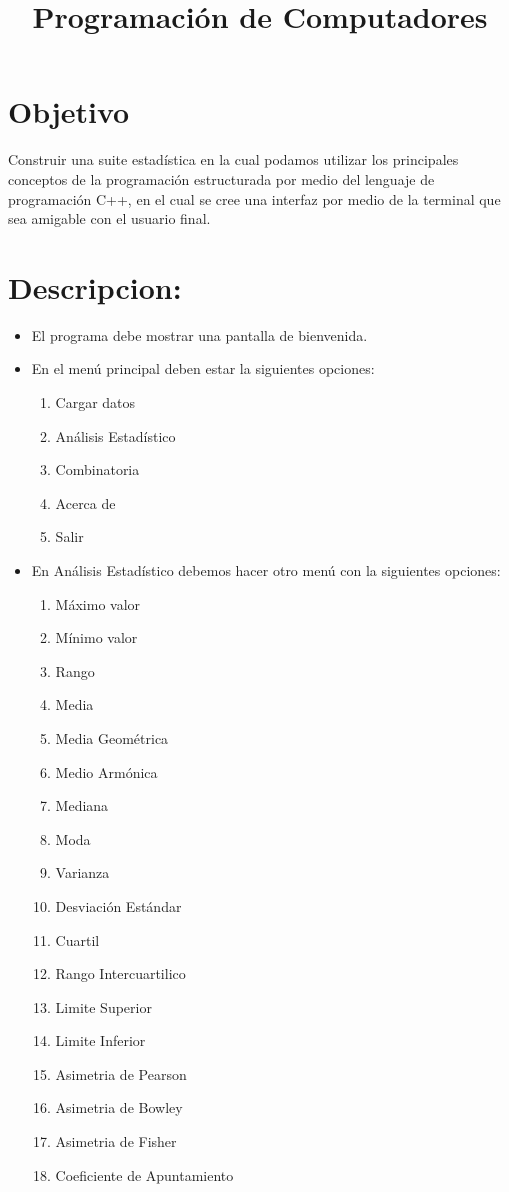 \documentclass[10pt,a4paper]{article}
\title{Programación de Computadores}
\date{}
\begin{document}
\maketitle
\section{Objetivo}
Construir una suite estadística en la cual podamos utilizar los principales conceptos de la programación estructurada por medio del lenguaje de programación C++, en el cual se cree una interfaz por medio de la terminal que sea amigable con el usuario final.
\section{Descripcion:}


\begin{itemize}
	\item El programa debe mostrar una pantalla de bienvenida.
	\item En el menú principal deben estar la siguientes opciones:
		
	\begin{enumerate}
		\item Cargar datos
		\item Análisis Estadístico
		\item Combinatoria
		\item Acerca de
		\item Salir
	\end{enumerate}

	\item En Análisis Estadístico debemos hacer otro menú con la siguientes opciones:
	\begin{enumerate}
		\item Máximo valor
		\item Mínimo valor
		\item Rango
		\item Media
		\item Media Geométrica
		\item Medio Armónica
		\item Mediana
		\item Moda
		\item Varianza
		\item Desviación Estándar
		\item Cuartil
		\item Rango Intercuartilico
		\item Limite Superior
		\item Limite Inferior
		\item Asimetria de Pearson
		\item Asimetria de Bowley
		\item Asimetria de Fisher
		\item Coeficiente de Apuntamiento		
	\end{enumerate}
	

\end{itemize}
\end{document}
